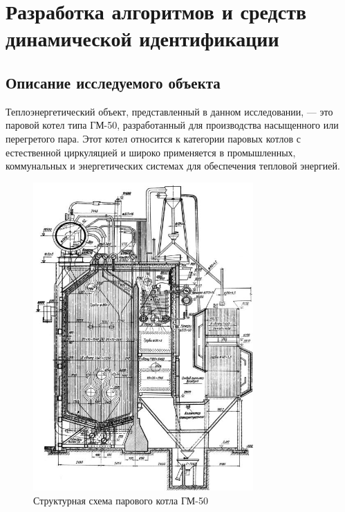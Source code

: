 \chapter{Разработка алгоритмов и средств динамической идентификации}
 
\section{Описание исследуемого объекта}

Теплоэнергетический объект, представленный в данном исследовании, — это паровой
котел типа ГМ-50, разработанный для производства насыщенного или перегретого
пара. Этот котел относится к категории паровых котлов с естественной циркуляцией
и широко применяется в промышленных, коммунальных и энергетических системах для
обеспечения тепловой энергией. 

\begin{figure}[H]
  \begin{center}
    \includegraphics[width=0.75\textwidth]{figures/gm-50.jpg}
  \end{center}
  \caption{Структурная схема парового котла ГМ-50}\label{fig:gm50}
\end{figure}


